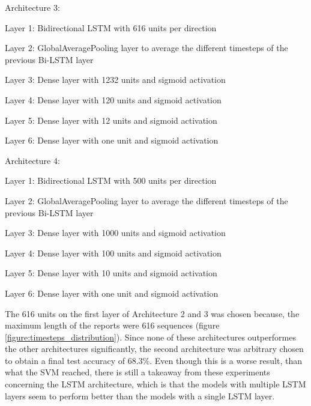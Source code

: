 Architecture 3:
\begin{addmargin}[1em]{0em}
    \begin{description}
        \item Layer 1: Bidirectional LSTM with 616 units per direction
        \item Layer 2: GlobalAveragePooling layer to average the different timesteps of the previous Bi-LSTM layer
        \item Layer 3: Dense layer with 1232 units and sigmoid activation
        \item Layer 4: Dense layer with 120 units and sigmoid activation
        \item Layer 5: Dense layer with 12 units and sigmoid activation
        \item Layer 6: Dense layer with one unit and sigmoid activation
    \end{description}
\end{addmargin}

Architecture 4:
\begin{addmargin}[1em]{1em}
    \begin{description}
        \item Layer 1: Bidirectional LSTM with 500 units per direction
        \item Layer 2: GlobalAveragePooling layer to average the different timesteps of the previous Bi-LSTM layer
        \item Layer 3: Dense layer with 1000 units and sigmoid activation
        \item Layer 4: Dense layer with 100 units and sigmoid activation
        \item Layer 5: Dense layer with 10 units and sigmoid activation
        \item Layer 6: Dense layer with one unit and sigmoid activation
    \end{description}
\end{addmargin}
The 616 units on the first layer of Architecture 2 and 3 was chosen because, the maximum length of the reports were 616 sequences (figure \ref{figure:timesteps_distribution}).
Since none of these architectures outperformes the other architectures significantly, the second architecture was arbitrary chosen to obtain a final test accuracy of 68.3\%.
Even though this is a worse result, than what the \ac{SVM} reached, there is still a takeaway from these experiments concerning the LSTM architecture, which is that the models with multiple LSTM layers seem to perform better than the models with a single LSTM layer.


